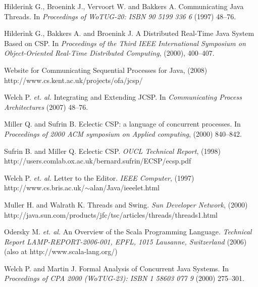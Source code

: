\documentclass[12pt]{IOS-Book-Article-CPA-2017}
\begin{document}

\listofendnotes

\def\href#1{{\def\~{$\sim$}\ttfamily\footnotesize #1}}

\begin{thebibliography}{99}


Hilderink G.,
Broenink J.,
Vervoort W. and
Bakkers A.
Communicating Java Threads.
In \textit{Proceedings of WoTUG-20: ISBN 90 5199 336 6} (1997) 48--76.

Hilderink G., Bakkers A. and Broenink J.
A Distributed Real-Time Java System Based on CSP.
In \textit{Proceedings of the Third IEEE International Symposium on 
Object-Oriented Real-Time Distributed Computing}, (2000), 400--407. 

Website for Communicating Sequential Processes for Java, (2008)
\\\href{http://www.cs.kent.ac.uk/projects/ofa/jcsp/}

Welch P. \textit{et. al.} Integrating and Extending JCSP. 
In \textit{Communicating Process Architectures} (2007) 48--76.

Miller Q. and Sufrin B. Eclectic CSP: a language of concurrent processes. 
In \textit{Proceedings of 2000 ACM symposium on Applied computing}, (2000) 840--842. 

Sufrin B. and Miller Q. Eclectic CSP. \textit{OUCL Technical Report}, (1998)
\\\href{http://users.comlab.ox.ac.uk/bernard.sufrin/ECSP/ecsp.pdf}

Welch P. \textit{et. al.} Letter to the Editor. \textit{IEEE Computer}, (1997)
\\\href{http://www.cs.bris.ac.uk/\~alan/Java/ieeelet.html}

Muller H. and Walrath K. Threads and Swing. \textit{Sun Developer Network}, (2000)
\\\href{http://java.sun.com/products/jfc/tsc/articles/threads/threads1.html}


Odersky M. \textit{et. al.} An Overview of the Scala Programming Language.
\textit{Technical Report LAMP-REPORT-2006-001, EPFL, 1015 Lausanne, Switzerland} (2006)
(also at \href{http://www.scala-lang.org/})

Welch P. and Martin J. Formal Analysis of Concurrent Java Systems.
In \textit{Proceedings of CPA 2000 (WoTUG-23): ISBN 1 58603 077 9} (2000) 275--301.



\end{thebibliography}
\end{document}
